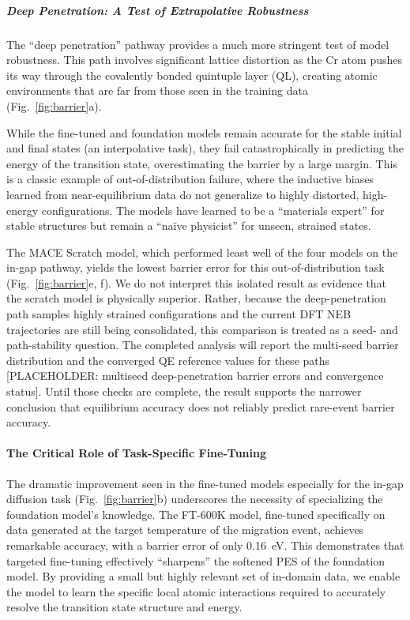 \documentclass[pdflatex,sn-mathphys-num]{sn-jnl}%
\providecommand{\reviewermap}[3]{}
\theoremstyle{thmstyleone}%
\theoremstyle{thmstyletwo}%
\theoremstyle{thmstylethree}%
\begin{document}
\subparagraph{Deep Penetration: A Test of Extrapolative Robustness}

The ``deep penetration'' pathway provides a much more stringent test of model robustness. This path involves significant lattice distortion as the Cr atom pushes its way through the covalently bonded quintuple layer (QL), creating atomic environments that are far from those seen in the training data (Fig.~\ref{fig:barrier}a).

While the fine-tuned and foundation models remain accurate for the stable initial and final states (an interpolative task), they fail catastrophically in predicting the energy of the transition state, overestimating the barrier by a large margin. This is a classic example of out-of-distribution failure, where the inductive biases learned from near-equilibrium data do not generalize to highly distorted, high-energy configurations. The models have learned to be a ``materials expert'' for stable structures but remain a ``naïve physicist'' for unseen, strained states.

\reviewermap{REV-A3}{pending-cluster}{Deep-penetration interpretation requires multi-seed and restarted QE NEB confirmation before ranking models.}
The MACE Scratch model, which performed least well of the four models on the in-gap pathway, yields the lowest barrier error for this out-of-distribution task (Fig.~\ref{fig:barrier}e, f). We do not interpret this isolated result as evidence that the scratch model is physically superior. Rather, because the deep-penetration path samples highly strained configurations and the current DFT NEB trajectories are still being consolidated, this comparison is treated as a seed- and path-stability question. The completed analysis will report the multi-seed barrier distribution and the converged QE reference values for these paths [PLACEHOLDER: multiseed deep-penetration barrier errors and convergence status]. Until those checks are complete, the result supports the narrower conclusion that equilibrium accuracy does not reliably predict rare-event barrier accuracy.

\paragraph{The Critical Role of Task-Specific Fine-Tuning}
\reviewermap{REV-A5}{pending-cluster}{Add Scratch-5\% random-initialization control trained on the same approximately 1000 configurations as FT-600K.}

The dramatic improvement seen in the fine-tuned models especially for the in-gap diffusion task (Fig.~\ref{fig:barrier}b) underscores the necessity of specializing the foundation model's knowledge. The FT-600K model, fine-tuned specifically on data generated at the target temperature of the migration event, achieves remarkable accuracy, with a barrier error of only 0.16~eV. This demonstrates that targeted fine-tuning effectively ``sharpens'' the softened PES of the foundation model. By providing a small but highly relevant set of in-domain data, we enable the model to learn the specific local atomic interactions required to accurately resolve the transition state structure and energy.
\end{document}
